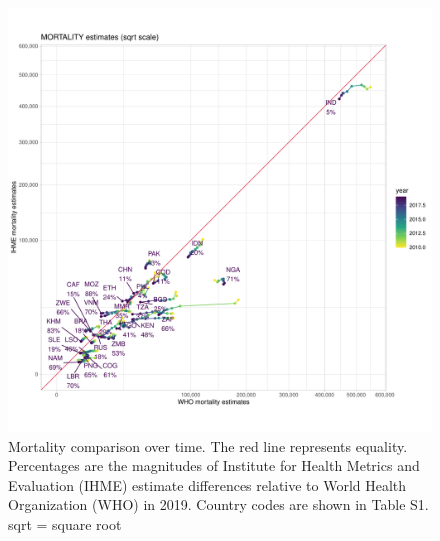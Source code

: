 \documentclass[12pt]{article}
\begin{document}
\FloatBarrier

\begin{figure}
  \centering
  \includegraphics[width=1\textwidth]{../plots/aF2b.pdf}
  \caption[Mortality comparison over time]{Mortality comparison over time. The
    red line represents equality. \\ Percentages are the magnitudes of Institute for Health Metrics
    and Evaluation (IHME) estimate differences
    relative to World Health Organization (WHO) in 2019. Country codes are shown
    in Table S1. sqrt = square root}
\end{figure}

\FloatBarrier
\end{document}
